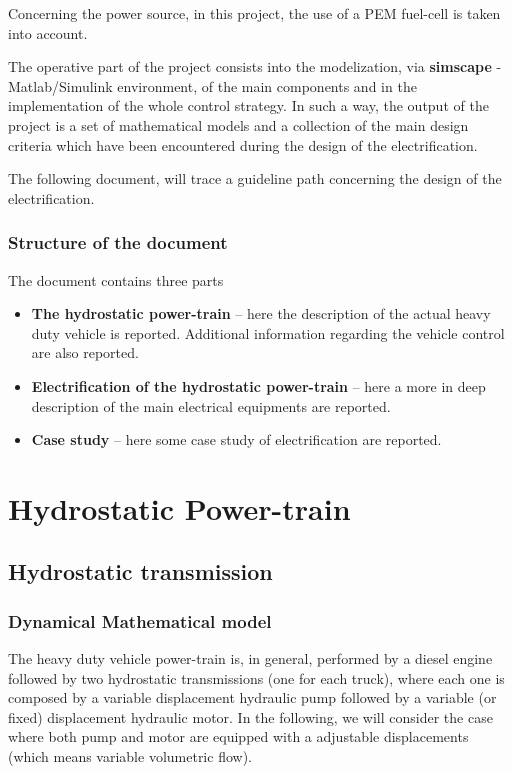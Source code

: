 \documentclass[11pt,a4paper,oneside]{book}
\begin{document}
\begin{onehalfspace}
Concerning the power source, in this project, the use of a PEM fuel-cell is taken into account.

The operative part of the project consists into the modelization, via \textbf{simscape} - Matlab/Simulink environment, of the main components and in the implementation of the whole control strategy. In such a way, the output of the project is a set of mathematical models and a collection of the main design criteria which have been encountered during the design of the electrification. 

The following document, will trace a guideline path concerning the design of the electrification. 

\section{Structure of the document}
The document contains three parts
\begin{itemize}
	\item[--] \textbf{The hydrostatic power-train} -- here the description of the actual heavy duty vehicle is reported. Additional information regarding the vehicle control are also reported.
	\item[--] \textbf{Electrification of the hydrostatic power-train} -- here a more in deep description of the main electrical equipments are reported.
	\item[--] \textbf{Case study} -- here some case study of electrification are reported.
\end{itemize}


\part{Hydrostatic Power-train}
\chapter{Hydrostatic transmission}
\section{Dynamical Mathematical model}
The heavy duty vehicle power-train is, in general, performed by a diesel engine followed by two hydrostatic transmissions (one for each truck), where each one is composed by a variable displacement hydraulic pump followed by a variable (or fixed) displacement hydraulic motor. In the following, we will consider the case where both pump and motor are equipped with a adjustable displacements (which means variable volumetric flow). 


\end{onehalfspace}
\end{document}
